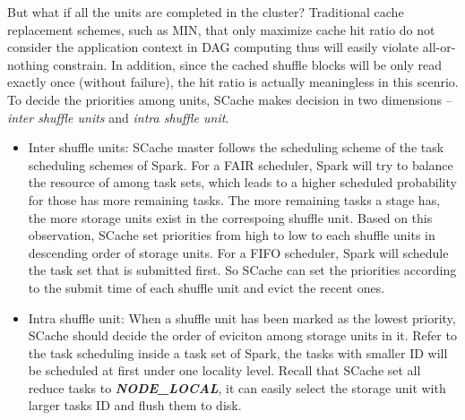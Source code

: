 But what if all the units are completed in the cluster? Traditional cache replacement schemes, such as MIN\cite{min}, that only maximize cache hit ratio do not consider the application context in DAG computing thus will easily violate all-or-nothing constrain. In addition, since the cached shuffle blocks will be only read exactly once (without failure), the hit ratio is actually meaningless in this scenrio. To decide the priorities among units, SCache makes decision in two dimensions -- \textit{inter shuffle units} and \textit{intra shuffle unit}. 
\begin{itemize}[noitemsep]
	\item Inter shuffle units: SCache master follows the scheduling scheme of the task scheduling schemes of Spark. For a FAIR scheduler, Spark will try to balance the resource of among task sets, which leads to a higher scheduled probability for those has more remaining tasks.  The more remaining tasks a stage has, the more storage units exist in the correspoing shuffle unit. Based on this observation, SCache set priorities from high to low to each shuffle units in descending order of storage units. For a FIFO scheduler, Spark will schedule the task set that is submitted first. So SCache can set the priorities according to the submit time of each shuffle unit and evict the recent ones.
	\item Intra shuffle unit: When a shuffle unit has been marked as the lowest priority, SCache should decide the order of eviciton among storage units in it. Refer to the task scheduling inside a task set of Spark, the tasks with smaller ID will be scheduled at first under one locality level. Recall that SCache set all reduce tasks to \textbf{\textit{NODE\_LOCAL}}, it can easily select the storage unit with larger tasks ID and flush them to disk.
\end{itemize}

